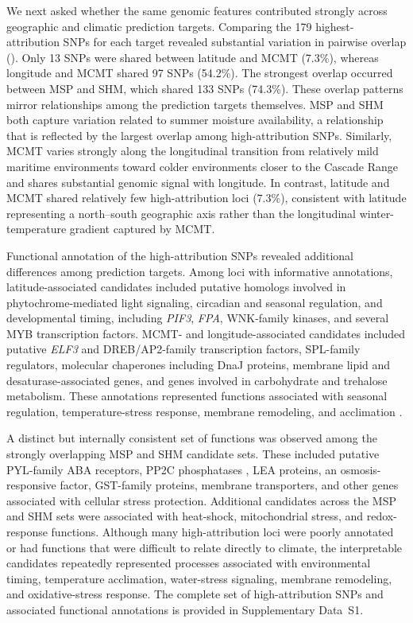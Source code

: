 \documentclass[]{article}
\begin{document}
We next asked whether the same genomic features contributed strongly across geographic 
and climatic prediction targets. Comparing the 179 highest-attribution SNPs for 
each target revealed substantial variation in pairwise overlap (). 
Only 13 SNPs were shared between latitude and MCMT (7.3\%), 
whereas longitude and MCMT shared 97 SNPs (54.2\%). 
The strongest overlap occurred between MSP and SHM, which shared 133 SNPs (74.3\%). 
These overlap patterns mirror relationships among the prediction targets themselves. 
MSP and SHM both capture variation related to summer moisture availability, a 
relationship that is reflected by the largest overlap among high-attribution SNPs. 
Similarly, MCMT varies strongly along the longitudinal transition from relatively 
mild maritime environments toward colder environments closer to the Cascade Range 
and shares substantial genomic signal with longitude. In contrast, 
latitude and MCMT shared relatively few high-attribution loci (7.3\%), 
consistent with latitude representing a north--south geographic axis rather 
than the longitudinal winter-temperature gradient captured by MCMT.

Functional annotation of the high-attribution SNPs revealed additional 
differences among prediction targets. Among loci with informative annotations, 
latitude-associated candidates included putative homologs involved in 
phytochrome-mediated light signaling, circadian and seasonal regulation, 
and developmental timing, including \textit{PIF3}, \textit{FPA}, WNK-family kinases, 
and several MYB transcription factors. MCMT- and longitude-associated candidates 
included putative \textit{ELF3} and DREB/AP2-family transcription factors, 
SPL-family regulators, molecular chaperones including DnaJ proteins, 
membrane lipid and desaturase-associated genes, and genes involved in 
carbohydrate and trehalose metabolism. These annotations represented 
functions associated with seasonal regulation, temperature-stress response, 
membrane remodeling, and acclimation \citep{lee_photoperiodic_2012, chen_acyl_2013}. 

A distinct but internally consistent set of functions was observed 
among the strongly overlapping MSP and SHM candidate sets. 
These included putative PYL-family ABA receptors, PP2C phosphatases \citep{park_abscisic_2009}, LEA proteins, 
an osmosis-responsive factor, GST-family proteins, membrane transporters, 
and other genes associated with cellular stress protection. 
Additional candidates across the MSP and SHM sets were associated with heat-shock, mitochondrial stress, and redox-response functions.
Although many high-attribution loci were 
poorly annotated or had functions that were difficult to relate directly to climate, 
the interpretable candidates repeatedly represented processes associated with 
environmental timing, temperature acclimation, water-stress signaling, 
membrane remodeling, and oxidative-stress response. %
The complete set of high-attribution SNPs and associated functional annotations is provided in Supplementary Data~S1.
\end{document}
